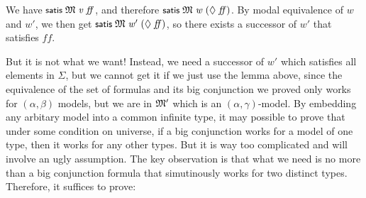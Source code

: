\documentclass[letterpaper]{article}
\renewcommand{\HOLConst}[1]{{\textsf{\upshape\small #1}}}
\renewcommand{\HOLinline}[1]{\ensuremath{#1}}
\begin{document}
We have \HOLinline{\HOLConst{satis}\;\HOLFreeVar{\ensuremath{\mathfrak{M}}}\;\HOLFreeVar{v}\;\HOLFreeVar{ff}}, and therefore \HOLinline{\HOLConst{satis}\;\HOLFreeVar{\ensuremath{\mathfrak{M}}}\;\HOLFreeVar{w}\;(\HOLSymConst{\ensuremath{\Diamond}}\;\HOLFreeVar{ff})}. By modal equivalence of $w$ and $w'$, we then get \HOLinline{\HOLConst{satis}\;\HOLFreeVar{\ensuremath{\mathfrak{M}}}\;\HOLFreeVar{w\sp{\prime}}\;(\HOLSymConst{\ensuremath{\Diamond}}\;\HOLFreeVar{ff})}, so there exists a successor of $w'$ that satisfies $ff$. 

But it is not what we want! Instead, we need a successor of $w'$ which satisfies all elements in $\Sigma$, but we cannot get it if we just use the lemma above, since the equivalence of the set of formulas and its big conjunction we proved only works for $(\alpha,\beta)$ models, but we are in \HOLinline{\HOLFreeVar{\ensuremath{\mathfrak{M}'}}} which is an $(\alpha,\gamma)$-model. By embedding any arbitary model into a common infinite type, it may possible to prove that under some condition on universe, if a big conjunction works for a model of one type, then it works for any other types. But it is way too complicated and will involve an ugly assumption. The key observation is that what we need is no more than a big conjunction formula that simutinously works for two distinct types. Therefore, it suffices to prove:
\end{document}
